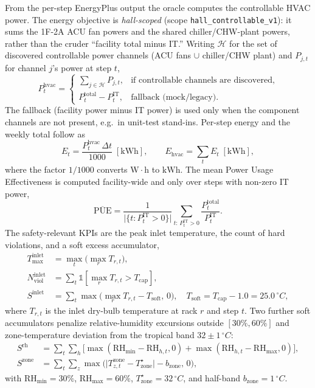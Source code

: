 \documentclass[11pt]{article}
\newcommand{\degC}{\ensuremath{^{\circ}}C}
\newcommand{\Tcap}{T_{\mathrm{cap}}}
\newcommand{\Esum}{E_{\mathrm{hvac}}}
\newcommand{\code}[1]{\texttt{\small #1}}
\begin{document}
From the per-step EnergyPlus output the oracle computes the controllable HVAC power. The
energy objective is \emph{hall-scoped} (scope \code{hall\_controllable\_v1}): it sums the
1F-2A ACU fan powers and the shared chiller/CHW-plant powers, rather than the cruder
``facility total minus IT.'' Writing \(\mathcal{H}\) for the set of discovered controllable
power channels (ACU fans \(\cup\) chiller/CHW plant) and \(P_{j,t}\) for channel \(j\)'s
power at step \(t\),
\begin{equation}
P^{\mathrm{hvac}}_t =
\begin{cases}
\displaystyle\sum_{j\in\mathcal{H}} P_{j,t}, & \text{if controllable channels are discovered,}\\[10pt]
P^{\mathrm{total}}_t - P^{\mathrm{IT}}_t, & \text{fallback (mock/legacy).}
\end{cases}
\label{eq:phvac}
\end{equation}
The fallback (facility power minus IT power) is used only when the component channels are
not present, e.g.\ in unit-test stand-ins. Per-step energy and the weekly total follow as
\begin{equation}
E_t = \frac{P^{\mathrm{hvac}}_t\,\Delta t}{1000}\;[\mathrm{kWh}],
\qquad
\Esum = \sum_t E_t \;[\mathrm{kWh}],
\label{eq:energy}
\end{equation}
where the factor \(1/1000\) converts \(\mathrm{W{\cdot}h}\) to \(\mathrm{kWh}\). The mean
Power Usage Effectiveness is computed facility-wide and only over steps with non-zero IT
power,
\begin{equation}
\overline{\mathrm{PUE}} = \frac{1}{\lvert\{t: P^{\mathrm{IT}}_t>0\}\rvert}
\sum_{t:\,P^{\mathrm{IT}}_t>0} \frac{P^{\mathrm{total}}_t}{P^{\mathrm{IT}}_t}.
\label{eq:pue}
\end{equation}
The safety-relevant KPIs are the peak inlet temperature, the count of hard violations,
and a soft excess accumulator,
\begin{align}
T^{\mathrm{inlet}}_{\max} &= \max_t\Big(\max_r T_{r,t}\Big), \label{eq:tmax}\\
N^{\mathrm{inlet}}_{\mathrm{viol}} &= \sum_t \mathbb{1}\!\left[\max_r T_{r,t} > \Tcap\right], \label{eq:nviol}\\
S^{\mathrm{inlet}} &= \sum_t \max\!\Big(\max_r T_{r,t} - T_{\mathrm{soft}},\,0\Big),
\quad T_{\mathrm{soft}} = \Tcap - 1.0 = 25.0\,\degC, \label{eq:sinlet}
\end{align}
where \(T_{r,t}\) is the inlet dry-bulb temperature at rack \(r\) and step \(t\). Two
further soft accumulators penalize relative-humidity excursions outside \([30\%,60\%]\)
and zone-temperature deviation from the tropical band \(32\pm1\,\degC\):
\begin{align}
S^{\mathrm{rh}} &= \sum_t\sum_h\Big[\max(\mathrm{RH}_{\min}-\mathrm{RH}_{h,t},0)
   + \max(\mathrm{RH}_{h,t}-\mathrm{RH}_{\max},0)\Big], \label{eq:srh}\\
S^{\mathrm{zone}} &= \sum_t\sum_z \max\!\Big(\lvert T^{\mathrm{zone}}_{z,t}-T^{\star}_{\mathrm{zone}}\rvert - b_{\mathrm{zone}},\,0\Big),
\label{eq:szone}
\end{align}
with \(\mathrm{RH}_{\min}=30\%\), \(\mathrm{RH}_{\max}=60\%\),
\(T^{\star}_{\mathrm{zone}}=32\,\degC\), and half-band \(b_{\mathrm{zone}}=1\,\degC\).
\end{document}
